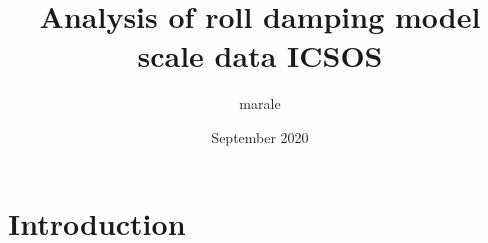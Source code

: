 \documentclass{article}
\title{Analysis of roll damping model scale data ICSOS}
\author{marale }
\date{September 2020}
\begin{document}
\maketitle

\section{Introduction}
\end{document}
